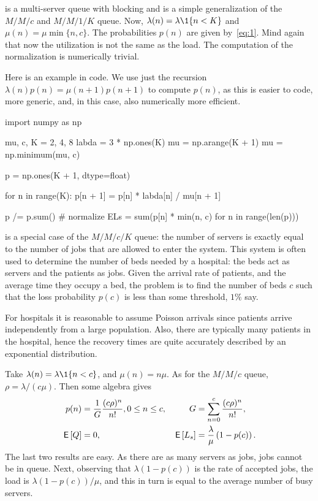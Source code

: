  is a multi-server queue with blocking and is a simple generalization of the $M/M/c$ and $M/M/1/K$ queue.
Now, $\lambda(n) = \lambda\1{n<K}$ and $\mu(n) = \mu \min\{n, c\}$.
The probabilities $p(n)$ are given by~\cref{eq:1}. Mind again that now the utilization is not the same as the load.
The computation of the normalization is numerically trivial.


Here is an example in code.  We use just the recursion $\lambda(n) p(n) = \mu(n+1)p(n+1)$ to compute $p(n)$, as this is easier to code, more generic, and, in this case, also numerically more efficient.

\begin{pyconsole}
import numpy as np

mu, c, K = 2, 4, 8
labda = 3 * np.ones(K)
mu = np.arange(K + 1)
mu = np.minimum(mu, c)

p = np.ones(K + 1, dtype=float)

for n in range(K):
    p[n + 1] = p[n] * labda[n] / mu[n + 1]

p /= p.sum()  # normalize
ELs = sum(p[n] * min(n, c) for n in range(len(p)))
\end{pyconsole}

 is a special case of the $M/M/c/K$ queue: the number of servers is exactly equal to the number of jobs that are allowed to enter the system. This system is often used to determine the number of beds needed by a hospital: the beds act as servers and the patients as jobs.
Given the arrival rate of patients, and the average time they occupy a bed, the problem is to find the number of beds $c$ such that the loss probability $p(c)$ is less than some threshold, $1\%$ say.

For hospitals it is reasonable to assume  Poisson arrivals since patients arrive independently from a large population.
Also, there are typically many patients in the hospital, hence the recovery times are quite accurately described by an exponential distribution.

Take $\lambda(n) = \lambda\1{n<c}$, and $\mu(n) = n \mu$.
As for the $M/M/c$ queue, $\rho = \lambda/(c \mu)$.
Then some algebra gives
 \begin{align*}
   p(n) &= \frac 1 G \frac{(c\rho)^n}{n!}, 0\leq n \leq c, &
   G&=\sum_{n=0}^{c} \frac{(c\rho)^n}{n!},\\
   \,\mathsf{E}\left[Q\right] &= 0, &
\,\mathsf{E}\left[L_s\right] &= \frac{\lambda}{\mu} \left(1- p(c)\right).
\end{align*}
The last two results are easy.
As there are as many servers as jobs, jobs cannot be in queue.
Next, observing that $\lambda(1-p(c))$ is the rate of accepted jobs, the load is $\lambda(1-p(c))/\mu$, and this in turn is equal to the average number of busy servers.


